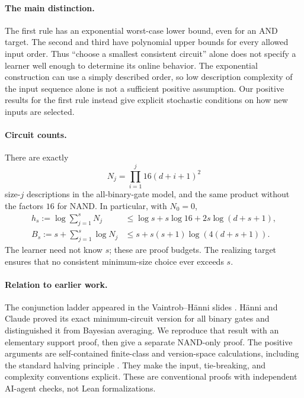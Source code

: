 \documentclass[11pt]{article}
\begin{document}
\paragraph{The main distinction.}
The first rule has an exponential worst-case lower bound, even for an
AND target. The second and third have polynomial upper bounds for every
allowed input order. Thus ``choose a smallest consistent circuit'' alone
does not specify a learner well enough to determine its online behavior.
The exponential construction can use a simply described order, so low
description complexity of the input sequence alone is not a sufficient
positive assumption. Our positive results for the first rule instead
give explicit stochastic conditions on how new inputs are selected.

\paragraph{Circuit counts.}
There are exactly
\[
 N_j=\prod_{i=1}^j16(d+i+1)^2
\]
size-$j$ descriptions in the all-binary-gate model, and the same product
without the factors $16$ for NAND. In particular, with $N_0=0$,
\begin{align}
 h_s:=\log\sum_{j=1}^sN_j
 &\le\log s+s\log16+2s\log(d+s+1),\label{eq:class-count}\\
 B_s:=s+\sum_{j=1}^s\log N_j
 &\le s+s(s+1)\log(4(d+s+1)).\label{eq:tier-count}
\end{align}
The learner need not know $s$; these are proof budgets. The realizing
target ensures that no consistent minimum-size choice ever exceeds $s$.

\paragraph{Relation to earlier work.}
The conjunction ladder appeared in the Vaintrob--H\"anni slides
\cite{slides}. H\"anni and Claude \cite{soi} proved its exact
minimum-circuit version for all binary gates and distinguished it from
Bayesian averaging. We reproduce that result with an elementary support
proof, then give a separate NAND-only proof. The positive arguments are
self-contained finite-class and version-space calculations, including
the standard halving principle \cite{littlestone}. They make the input,
tie-breaking, and complexity conventions explicit. These are conventional
proofs with independent AI-agent checks, not Lean formalizations.







\end{document}
